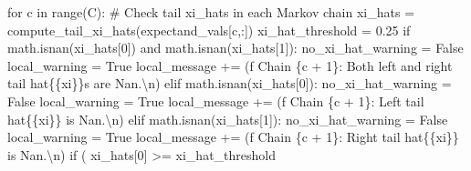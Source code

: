\documentclass[
  letterpaper,
  DIV=11,
  numbers=noendperiod]{scrartcl}
\newenvironment{Shaded}{\begin{snugshade}}{\end{snugshade}}
\newcommand{\BuiltInTok}[1]{\textcolor[rgb]{0.00,0.23,0.31}{#1}}
\newcommand{\CharTok}[1]{\textcolor[rgb]{0.13,0.47,0.30}{#1}}
\newcommand{\CommentTok}[1]{\textcolor[rgb]{0.37,0.37,0.37}{#1}}
\newcommand{\ControlFlowTok}[1]{\textcolor[rgb]{0.00,0.23,0.31}{#1}}
\newcommand{\DecValTok}[1]{\textcolor[rgb]{0.68,0.00,0.00}{#1}}
\newcommand{\FloatTok}[1]{\textcolor[rgb]{0.68,0.00,0.00}{#1}}
\newcommand{\KeywordTok}[1]{\textcolor[rgb]{0.00,0.23,0.31}{#1}}
\newcommand{\NormalTok}[1]{\textcolor[rgb]{0.00,0.23,0.31}{#1}}
\newcommand{\OperatorTok}[1]{\textcolor[rgb]{0.37,0.37,0.37}{#1}}
\newcommand{\SpecialCharTok}[1]{\textcolor[rgb]{0.37,0.37,0.37}{#1}}
\newcommand{\SpecialStringTok}[1]{\textcolor[rgb]{0.13,0.47,0.30}{#1}}
\newcommand{\StringTok}[1]{\textcolor[rgb]{0.13,0.47,0.30}{#1}}
\newcommand{\VariableTok}[1]{\textcolor[rgb]{0.07,0.07,0.07}{#1}}
\begin{document}
\begin{Shaded}
\begin{Highlighting}[]
    \ControlFlowTok{for}\NormalTok{ c }\KeywordTok{in} \BuiltInTok{range}\NormalTok{(C):}
      \CommentTok{\# Check tail xi\_hats in each Markov chain}
\NormalTok{      xi\_hats }\OperatorTok{=}\NormalTok{ compute\_tail\_xi\_hats(expectand\_vals[c,:])}
\NormalTok{      xi\_hat\_threshold }\OperatorTok{=} \FloatTok{0.25}
      \ControlFlowTok{if}\NormalTok{ math.isnan(xi\_hats[}\DecValTok{0}\NormalTok{]) }\KeywordTok{and}\NormalTok{ math.isnan(xi\_hats[}\DecValTok{1}\NormalTok{]):}
\NormalTok{        no\_xi\_hat\_warning }\OperatorTok{=} \VariableTok{False}
\NormalTok{        local\_warning }\OperatorTok{=} \VariableTok{True}
\NormalTok{        local\_message }\OperatorTok{+=}\NormalTok{ (}\SpecialStringTok{f\textquotesingle{}  Chain }\SpecialCharTok{\{}\NormalTok{c }\OperatorTok{+} \DecValTok{1}\SpecialCharTok{\}}\SpecialStringTok{: Both left and right tail \textquotesingle{}}
                          \StringTok{\textquotesingle{}hat}\SpecialCharTok{\{\{}\StringTok{xi}\SpecialCharTok{\}\}}\StringTok{s are Nan.}\CharTok{\textbackslash{}n}\StringTok{\textquotesingle{}}\NormalTok{)}
      \ControlFlowTok{elif}\NormalTok{ math.isnan(xi\_hats[}\DecValTok{0}\NormalTok{]):}
\NormalTok{        no\_xi\_hat\_warning }\OperatorTok{=} \VariableTok{False}
\NormalTok{        local\_warning }\OperatorTok{=} \VariableTok{True}
\NormalTok{        local\_message }\OperatorTok{+=}\NormalTok{ (}\SpecialStringTok{f\textquotesingle{}  Chain }\SpecialCharTok{\{}\NormalTok{c }\OperatorTok{+} \DecValTok{1}\SpecialCharTok{\}}\SpecialStringTok{: Left tail \textquotesingle{}}
                          \StringTok{\textquotesingle{}hat}\SpecialCharTok{\{\{}\StringTok{xi}\SpecialCharTok{\}\}}\StringTok{ is Nan.}\CharTok{\textbackslash{}n}\StringTok{\textquotesingle{}}\NormalTok{)}
      \ControlFlowTok{elif}\NormalTok{ math.isnan(xi\_hats[}\DecValTok{1}\NormalTok{]):}
\NormalTok{        no\_xi\_hat\_warning }\OperatorTok{=} \VariableTok{False}
\NormalTok{        local\_warning }\OperatorTok{=} \VariableTok{True}
\NormalTok{        local\_message }\OperatorTok{+=}\NormalTok{ (}\SpecialStringTok{f\textquotesingle{}  Chain }\SpecialCharTok{\{}\NormalTok{c }\OperatorTok{+} \DecValTok{1}\SpecialCharTok{\}}\SpecialStringTok{: Right tail \textquotesingle{}}
                          \StringTok{\textquotesingle{}hat}\SpecialCharTok{\{\{}\StringTok{xi}\SpecialCharTok{\}\}}\StringTok{ is Nan.}\CharTok{\textbackslash{}n}\StringTok{\textquotesingle{}}\NormalTok{)}
      \ControlFlowTok{if}\NormalTok{ (    xi\_hats[}\DecValTok{0}\NormalTok{] }\OperatorTok{\textgreater{}=}\NormalTok{ xi\_hat\_threshold}

\end{Highlighting}
\end{Shaded}
\end{document}
